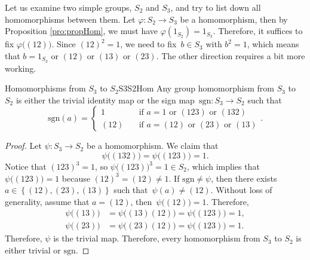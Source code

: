 \documentclass[math]{amznotes}
\theoremstyle{remark}
\newcommand{\0}{\mathbf{0}}
\newcommand{\1}{\mathbf{1}}
\begin{document}
Let us examine two simple groups, $S_2$ and $S_3$, and try to list down all homomorphisms between them. Let $\varphi \colon S_2 \to S_3$ be a homomorphism, then by Proposition \ref{pro:propHom}, we must have $\varphi\left(1_{S_2}\right) = 1_{S_3}$. Therefore, it suffices to fix $\varphi\bigl(\left(12\right)\bigr)$. Since $\left(12\right)^2 = 1$, we need to fix~$b \in S_3$ with $b^2 = 1$, which means that $b = 1_{S_3}$ or $\left(12\right)$ or $\left(13\right)$ or $\left(23\right)$. The other direction requires a bit more working.
\begin{probox}{Homomorphisms from $S_3$ to $S_2$}{S3S2Hom}
    Any group homomorphism from $S_3$ to $S_2$ is either the trivial identity map or the sign map~$\mathrm{sgn} \colon S_3 \to S_2$ such that 
    \begin{equation*}
        \mathrm{sgn}\left(a\right) = \begin{cases}
            1 & \quad\textrm{if } a = 1 \textrm{ or } \left(123\right) \textrm{ or } \left(132\right) \\
            \left(12\right) & \quad\textrm{if } a = \left(12\right) \textrm{ or } \left(23\right) \textrm{ or } \left(13\right)
        \end{cases}.
    \end{equation*}
    \tcblower
    \begin{proof}
        Let $\psi \colon S_3 \to S_2$ be a homomorphism. We claim that 
        \begin{equation*}
            \psi\bigl(\left(132\right)\bigr) = \psi\bigl(\left(123\right)\bigr) = 1.
        \end{equation*}
        Notice that $\left(123\right)^3 = 1$, so $\psi\bigl(\left(123\right)\bigr)^3 = 1 \in S_2$, which implies that~$\psi\bigl(\left(123\right)\bigr) = 1$ because $\left(12\right)^3 = \left(12\right) \neq 1$. If $\mathrm{sgn} \neq \psi$, then there exists $a \in \left\{\left(12\right), \left(23\right), \left(13\right)\right\}$ such that~$\psi\left(a\right) \neq \left(12\right)$. Without loss of generality, assume that $a = \left(12\right)$, then~$\psi\bigl(\left(12\right)\bigr) = 1$. Therefore,
        \begin{align*}
            \psi\bigl(\left(13\right)\bigr) & = \psi\bigl(\left(13\right)\left(12\right)\bigr) = \psi\bigl(\left(123\right)\bigr) = 1, \\
            \psi\bigl(\left(23\right)\bigr) & = \psi\bigl(\left(23\right)\left(12\right)\bigr) = \psi\bigl(\left(123\right)\bigr) = 1.
        \end{align*}
        Therefore, $\psi$ is the trivial map. Therefore, every homomorphism from $S_3$ to $S_2$ is either trivial or $\mathrm{sgn}$.
    \end{proof}
\end{probox}
\end{document}

